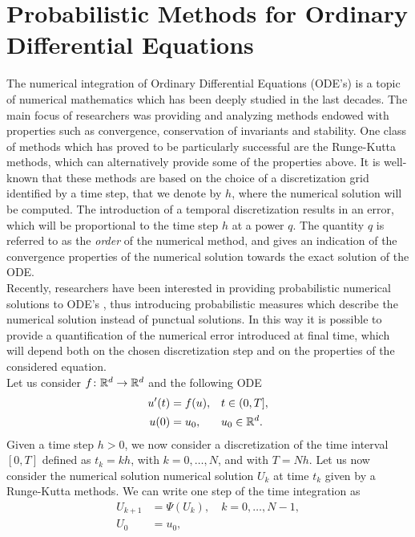 \section{Probabilistic Methods for Ordinary Differential Equations}

The numerical integration of Ordinary Differential Equations (ODE's) is a topic of numerical mathematics which has been deeply studied in the last decades. The main focus of researchers was providing and analyzing methods endowed with properties such as convergence, conservation of invariants and stability. One class of methods which has proved to be particularly successful are the Runge-Kutta methods, which can alternatively provide some of the properties above. It is well-known that these methods are based on the choice of a discretization grid identified by a time step, that we denote by $h$, where the numerical solution will be computed. The introduction of a temporal discretization results in an error, which will be proportional to the time step $h$ at a power $q$. The quantity $q$ is referred to as the \textit{order} of the numerical method, and gives an indication of the convergence properties of the numerical solution towards the exact solution of the ODE. \\
Recently, researchers have been interested in providing probabilistic numerical solutions to ODE's \cite{CGS16}, thus introducing probabilistic measures which describe the numerical solution instead of punctual solutions. In this way it is possible to provide a quantification of the numerical error introduced at final time, which will depend both on the chosen discretization step and on the properties of the considered equation. \\
Let us consider $f\colon \mathbb{R}^d \to \mathbb{R}^d$ and the following ODE
\begin{equation}\label{eq:ODE}
\begin{aligned}
	u'(t) &= f(u), &&  t \in (0, T], \\
	u(0)  &= u_0, && u_0 \in \mathbb{R}^d.
\end{aligned}
\end{equation}
Given a time step $h >0$, we now consider a discretization of the time interval $[0, T]$ defined as $t_k = kh$, with $k = 0, \ldots, N$, and with $T = Nh$. Let us now consider the numerical solution numerical solution $U_k$ at time $t_k$ given by a Runge-Kutta methods. We can write one step of the time integration as 
\begin{equation}\label{numericalODE}
\begin{aligned}
	U_{k+1} &= \Psi(U_k), \quad k = 0, \ldots, N-1, \\
	U_{0} &= u_0, 
\end{aligned}
\end{equation}
